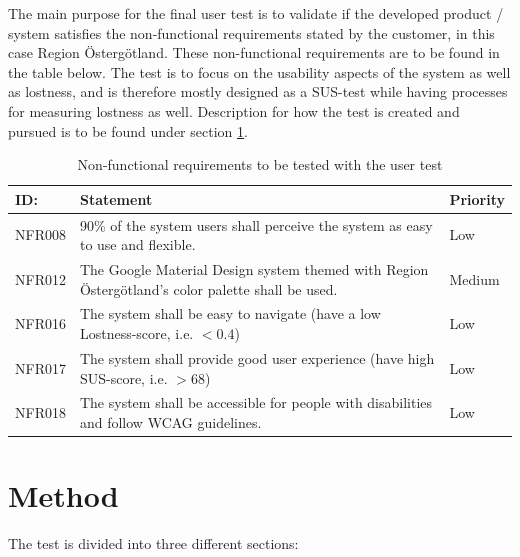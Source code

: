 \documentclass[12pt]{article}
\begin{document}
    The main purpose for the final user test is to validate if the developed product / system satisfies the non-functional requirements stated by the customer, in this case Region Östergötland. These non-functional requirements are to be found in the table below. The test is to focus on the usability aspects of the system as well as lostness, and is therefore mostly designed as a SUS-test while having processes for measuring lostness as well. Description for how the test is created and pursued is to be found under section \ref{sec: Method}. 
    \begin{table}[H]

    \begin{center}
    \begin{tabular}{ | m{2cm} |m{10cm} |m{2cm}| }  
    \hline
    \textbf{ID:} & \textbf{Statement} & \textbf{Priority} \\
    \hline
    NFR008 & 
    90\% of the system users shall perceive the system as easy to use and flexible. & 
    Low \\ 
    \hline
    NFR012 & 
    The Google Material Design system themed with Region Östergötland’s color palette shall be used. & 
    Medium \\ 
    \hline
    NFR016 & 
    The system shall be easy to navigate (have a low Lostness-score, i.e. $< 0.4$) &
    Low \\ 
    \hline
    NFR017 & 
    The system shall provide good user experience (have high SUS-score, i.e. $> 68$) & 
    Low \\ 
    \hline
    NFR018 & 
    The system shall be accessible for people with disabilities and follow WCAG guidelines. &
    Low \\ 
    \hline
    \end{tabular}
    \end{center}
    \caption{\label{tab:NFRs}Non-functional requirements to be tested with the user test}
    \end{table}
    \section{Method}
    \label{sec: Method}
    The test is divided into three different sections:
    
\end{document}
